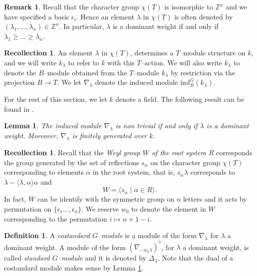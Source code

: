\documentclass{article}
\theoremstyle{plain}
\newtheorem{Lemma}[Th]{Lemma}
\theoremstyle{definition}
\newtheorem{Def}[Th]{Definition}
\newtheorem{Rem}[Th]{Remark}
\newtheorem{Rec}[Th]{Recollection}
\begin{document}
\begin{Rem}
   Recall that the character group $\chi(T)$ is isomorphic to $\mathbb{Z}^n$ and we have specified a basis $\epsilon_i$. Hence an element $\lambda$ in $\chi(T)$ is often denoted by $(\lambda_1,\ldots,\lambda_n)\in \mathbb{Z}^n$. In particular, $\lambda$ is a dominant weight if and only if  $\lambda_1\geq\ldots\geq \lambda_n$. 
\end{Rem}

\begin{Rec}
An element $\lambda$ in $\chi(T)$, determines a $T$--module structure on $k$, and we will write $k_\lambda$ to refer to $k$ with this $T$--action. We will also write $k_\lambda$ to denote the $B$--module obtained from the $T$--module $k_\lambda$ by restriction via the projection $ B\to T$. We let $\nabla_\lambda$ denote the induced module $\mathrm{ind}_B^G(k_\lambda)$.     
\end{Rec}



For the rest of this section, we let $k$ denote a field. The following result can be found in \cite[Section II.2.6, I.5.12]{jantzen2003representations}.

\begin{Lemma}\label{costandard have finite dimension over k}
    The induced module $\nabla_\lambda$ is non trivial if and only if $\lambda$ is a dominant weight. Moreover, $\nabla_\lambda$ is finitely generated over $k$. 
\end{Lemma}

\begin{Rec}
    Recall that the \textit{Weyl group $W$ of  the root system $R$} corresponds the group generated by the set of reflections $s_\alpha$ on the character group $\chi(T)$ corresponding to elements $\alpha$ in the root system, that is, $s_\alpha \lambda$ corresponds to $\lambda - \langle \lambda, \alpha\rangle\alpha$ and 
    \[
    W=\langle s_\alpha\mid \alpha \in R\rangle. 
    \]
    In fact, $W$ can be identify with the symmetric group on $n$ letters and it acts by permutation on $\{\epsilon_1\ldots,\epsilon_n\}$. We reserve $w_0$ to denote the element in $W$ corresponding to the permutation $i\mapsto n+1-i$.
\end{Rec}

\begin{Def}
 A \textit{costandard $G$--module} is a module of the form $\nabla_\lambda$ for $\lambda$ a dominant weight. A  module of the form $(\nabla_{-w_0\lambda})^*$, for $\lambda$ a dominant weight, is called \textit{standard $G$--module} and it is denoted by $\Delta_\lambda$. Note that the dual of a costandard module makes sense by Lemma \ref{costandard have finite dimension over k}.
\end{Def}
\end{document}
